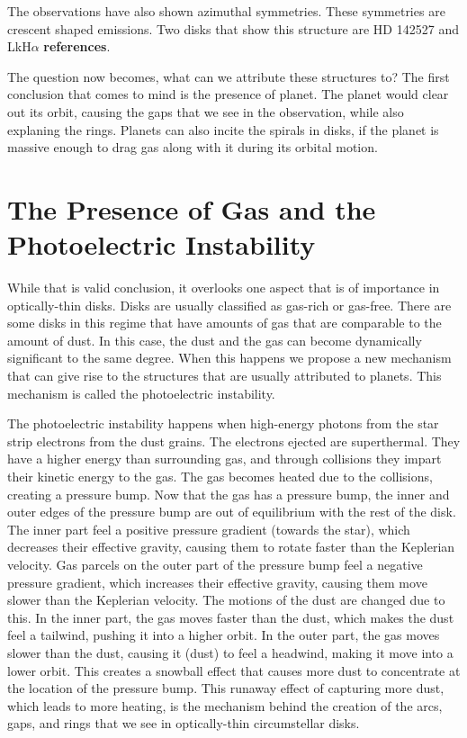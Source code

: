 \documentclass[onecolumn]{report}
\begin{document}
The observations have also shown azimuthal symmetries. These symmetries are crescent shaped emissions. Two disks that show this structure are HD 142527 and LkH$\alpha$ \textbf{references}. 

The question now becomes, what can we attribute these structures to? The first conclusion that comes to mind is the presence of planet. The planet would clear out its orbit, causing the gaps that we see in the observation, while also explaning the rings. Planets can also incite the spirals in disks, if the planet is massive enough to drag gas along with it during its orbital motion.

\section{The Presence of Gas and the Photoelectric Instability}

While that is valid conclusion, it overlooks one aspect that is of importance in optically-thin disks. Disks are usually classified as gas-rich or gas-free. There are some disks in this regime that have amounts of gas that are comparable to the amount of dust. In this case, the dust and the gas can become dynamically significant to the same degree. When this happens we propose a new mechanism that can give rise to the structures that are usually attributed to planets. This mechanism is called the photoelectric instability.

The photoelectric instability happens when high-energy photons from the star strip electrons from the dust grains. The electrons ejected are superthermal. They have a higher energy than surrounding gas, and through collisions they impart their kinetic energy to the gas. The gas becomes heated due to the collisions, creating a pressure bump. Now that the gas has a pressure bump, the inner and outer edges of the pressure bump are out of equilibrium with the rest of the disk. The inner part feel a positive pressure gradient (towards the star), which decreases their effective gravity, causing them to rotate faster than the Keplerian velocity. Gas parcels on the outer part of the pressure bump feel a negative pressure gradient, which increases their effective gravity, causing them move slower than the Keplerian velocity. The motions of the dust are changed due to this. In the inner part, the gas moves faster than the dust, which makes the dust feel a tailwind, pushing it into a higher orbit. In the outer part, the gas moves slower than the dust, causing it (dust) to feel a headwind, making it move into a lower orbit. This creates a snowball effect that causes more dust to concentrate at the location of the pressure bump. This runaway effect of capturing more dust, which leads to more heating, is the mechanism behind the creation of the arcs, gaps, and rings that we see in optically-thin circumstellar disks.
\end{document}
